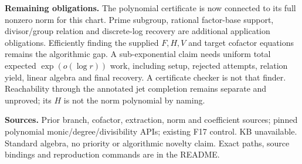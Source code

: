 \documentclass[11pt]{article}
\begin{document}
\textbf{Remaining obligations.} The polynomial certificate is now connected
to its full nonzero norm for this chart. Prime subgroup, rational factor-base
support, divisor/group relation and discrete-log recovery are additional
application obligations. Efficiently finding the supplied $F,H,V$ and target
cofactor equations remains the algorithmic gap. A sub-exponential claim needs
uniform total expected $\exp(o(\log r))$ work, including setup, rejected
attempts, relation yield, linear algebra and final recovery. A certificate
checker is not that finder. Reachability through the annotated jet completion
remains separate and unproved; its $H$ is not the norm polynomial by naming.

\textbf{Sources.} Prior branch, cofactor, extraction, norm and coefficient
sources; pinned polynomial monic/degree/divisibility APIs; existing F17 control.
KB unavailable. Standard algebra, no priority or algorithmic novelty claim.
Exact paths, source bindings and reproduction commands are in the README.
\end{document}
